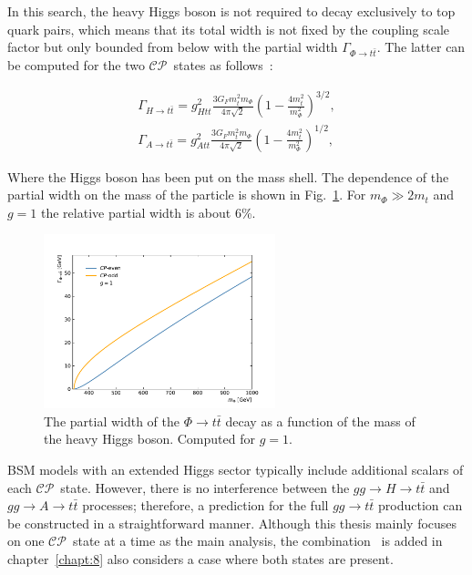 In this search, the heavy Higgs boson is not required to decay exclusively to top quark pairs, which means that its total width is not fixed by the coupling scale factor but only bounded from below with the partial width $\Gamma_{\Phi\rightarrow t\bar t}$.
The latter can be computed for the two $\mathcal{CP}$~states as follows~\cite{Dicus:1994bm}:
\begin{linenomath}
\begin{equation}
\begin{gathered}
 \Gamma_{H\rightarrow t\bar t} = g_{Htt}^2 \frac{3 G_F m_{t}^2 m_\Phi}{4\pi \sqrt{2}} \left(1 - \frac{4 m_{t}^2}{m_\Phi^2}\right)^{3/2}, \\
 \Gamma_{A\rightarrow t\bar t} = g_{Att}^2 \frac{3 G_F m_{t}^2 m_\Phi}{4\pi \sqrt{2}} \left(1 - \frac{4 m_{t}^2}{m_\Phi^2}\right)^{1/2},
\end{gathered}
\label{Eq:Width}
\end{equation}
\end{linenomath}

Where the Higgs boson has been put on the mass shell. The dependence of the partial width on the mass of the particle is shown in Fig.~\ref{fig:Higgs_width}.
For $m_\Phi \gg 2m_{t}$ and $g = 1$ the relative partial width is about 6\%.

\begin{figure}
  \centering
  \includegraphics[width=0.6\textwidth]{fig/chapt4/gen_plots/analytical/width.pdf}
  \caption{The partial width of the $\Phi \rightarrow t\bar t$ decay as a function of the mass of the heavy Higgs boson. Computed for $g = 1$.}
  \label{fig:Higgs_width}
\end{figure}

BSM models with an extended Higgs sector typically include additional scalars of each $\mathcal{CP}$~state.
However, there is no interference between the $gg \rightarrow H \rightarrow t\bar t$ and $gg \rightarrow A \rightarrow t\bar t$ processes; therefore, a prediction for the full $gg \rightarrow t\bar t$ production can be constructed in a straightforward manner.
Although this thesis mainly focuses on one $\mathcal{CP}$~state at a time as the main analysis, the combination~\cite{CMS-AN-17-202} is added in chapter~\ref{chapt:8} also considers a case where both states are present.

